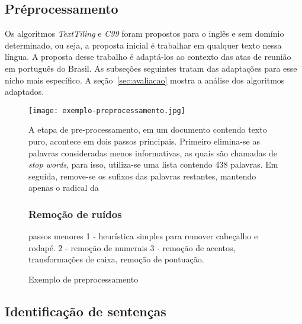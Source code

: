 \subsection{Préprocessamento}
	\label{subsec:preprocessamento}



	Os algoritmos \textit{TextTiling} e \textit{C99} foram propostos para o inglês e sem domínio determinado, ou seja, a proposta inicial é trabalhar em qualquer texto nessa língua.
	A proposta desse trabalho é adaptá-los ao contexto das atas de reunião em português do Brasil. As subseções seguintes tratam das adaptações para esse nicho mais específico. A seção~\ref{sec:avaliacao} mostra a análise dos algoritmos adaptados.


  \begin{figure}[!h]

	\centering
	\texttt{[image: exemplo-preprocessamento.jpg]}
	\caption{Exemplo de preprocessamento}
	\label{fig:exemplomatrixrank}


	A etapa de pre-processamento, em um documento contendo texto puro, acontece em dois passos principais. Primeiro elimina-se as palavras consideradas menos informativas, as quais são chamadas de \textit{stop words}, para isso, utiliza-se uma lista contendo 438 palavras. Em seguida, remove-se os sufixos das palavras restantes, mantendo apenas o radical da


	\subsubsection{Remoção de ruídos}
		passos menores
		1 - heurística simples para remover cabeçalho e rodapé.
		2 - remoção de numerais
		3 - remoção de acentos, transformações de caixa, remoção de pontuação.
		

  \end{figure}




	

\subsection{Identificação de sentenças}
	\label{subsec:indentificacaosentencas}


